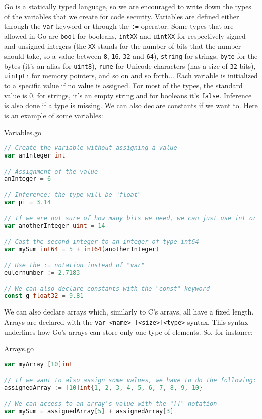 Go is a statically typed language, so we are encouraged to write down the types of the variables that we create for code security. Variables are defined either through the \verb|var| keyword or through the \verb|:=| operator.
\nwl
Some types that are allowed in Go are \verb|bool| for booleans, \verb|intXX| and \verb|uintXX| for respectively signed and unsigned integers (the \verb|XX| stands for the number of bits that the number should take, so a value between \verb|8|, \verb|16|, \verb|32| and \verb|64|), \verb|string| for strings, \verb|byte| for the bytes (it's an alias for \verb|uint8|), \verb|rune| for Unicode characters (has a size of \verb|32| bits), \verb|uintptr| for memory pointers, and so on and so forth...
\nwl
Each variable is initialized to a specific value if no value is assigned. For most of the types, the standard value is 0, for strings, it's an empty string and for booleans it's \verb|false|. Inference is also done if a type is missing. We can also declare constants if we want to. Here is an example of some variables:

\begin{codeblock}{Variables.go}
    \begin{lstlisting}[language = go]
// Create the variable without assigning a value
var anInteger int

// Assignment of the value
anInteger = 6

// Inference: the type will be "float"
var pi = 3.14

// If we are not sure of how many bits we need, we can just use int or uint
var anotherInteger uint = 14

// Cast the second integer to an integer of type int64
var mySum int64 = 5 + int64(anotherInteger)

// Use the := notation instead of "var"
eulernumber := 2.7183

// We can also declare constants with the "const" keyword
const g float32 = 9.81\end{lstlisting}
\end{codeblock}

We can also declare arrays which, similarly to C's arrays, all have a fixed length. Arrays are declared with the \verb|var <name> [<size>]<type>| syntax. This syntax underlines how Go's arrays can store only one type of elements. So, for instance:
\pagebreak
\begin{codeblock}{Arrays.go}
    \begin{lstlisting}[language = go]
var myArray [10]int

// If we want to also assign some values, we have to do the following:
assignedArray := [10]int{1, 2, 3, 4, 5, 6, 7, 8, 9, 10}

// We can access to an array's value with the "[]" notation
var mySum = assignedArray[5] + assignedArray[3]
    \end{lstlisting}
\end{codeblock}

